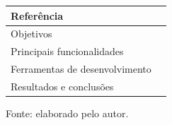 \begin{longtable}[]{@{}
  >{\raggedright\arraybackslash}p{}
  >{\raggedright\arraybackslash}p{}@{}}
\toprule\noalign{}
\begin{minipage}[b]{\linewidth}\raggedright
Referência
\end{minipage} & \begin{minipage}[b]{\linewidth}\raggedright
\end{minipage} \\
\midrule\noalign{}
\endhead
\bottomrule\noalign{}
\endlastfoot
Objetivos & \\
Principais funcionalidades & \\
Ferramentas de desenvolvimento & \\
Resultados e conclusões & \\
\end{longtable}

Fonte: elaborado pelo autor.
